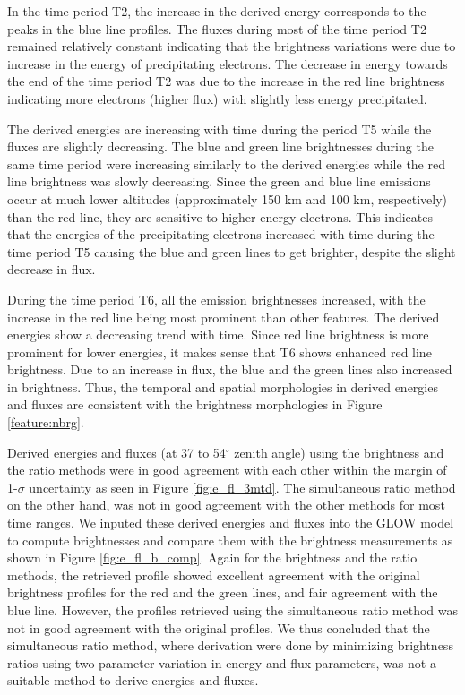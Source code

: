 \documentclass[crop=false,class=mitthesis,oneside,font=12pt]{standalone}
\begin{document}
In the time period T2, the increase in the derived energy corresponds to the peaks in the blue line profiles. The fluxes during most of the time period T2 remained relatively constant indicating that the brightness variations were due to increase in the energy of precipitating electrons. The decrease in energy towards the end of the time period T2 was due to the increase in the red line brightness indicating more electrons (higher flux) with slightly less energy precipitated. 

The derived energies are increasing with time during the period T5 while the fluxes are slightly decreasing. The blue and green line brightnesses during the same time period were increasing similarly to the derived energies while the red line brightness was slowly decreasing. Since the green and blue line emissions occur at much lower altitudes (approximately 150 km and 100 km, respectively) than the red line, they are sensitive to higher energy electrons. This indicates that the energies of the precipitating electrons increased with time during the time period T5 causing the blue and green lines to get brighter, despite the slight decrease in flux.

During the time period T6, all the emission brightnesses increased, with the increase in the red line being most prominent than other features. The derived energies show a decreasing trend with time. Since red line brightness is more prominent for lower energies, it makes sense that T6 shows enhanced red line brightness. Due to an increase in flux, the blue and the green lines also increased in brightness. Thus, the temporal and spatial morphologies in derived energies and fluxes are consistent with the brightness morphologies in Figure \ref{feature:nbrg}. 

Derived energies and fluxes (at 37 to 54$^\circ$ zenith angle) using the brightness and the ratio methods were in good agreement with each other within the margin of 1-$\sigma$ uncertainty as seen in Figure \ref{fig:e_fl_3mtd}. The simultaneous ratio method on the other hand, was not in good agreement with the other methods for most time ranges. We inputed these derived energies and fluxes into the GLOW model to compute brightnesses and compare them with the brightness measurements as shown in Figure \ref{fig:e_fl_b_comp}. Again for the brightness and the ratio methods, the retrieved profile showed excellent agreement with the original brightness profiles for the red and the green lines, and fair agreement with the blue line. However, the profiles retrieved using the simultaneous ratio method was not in good agreement with the original profiles. We thus concluded that the simultaneous ratio method, where derivation were done by minimizing brightness ratios using two parameter variation in energy and flux parameters, was not a suitable method to derive energies and fluxes.
\end{document}
